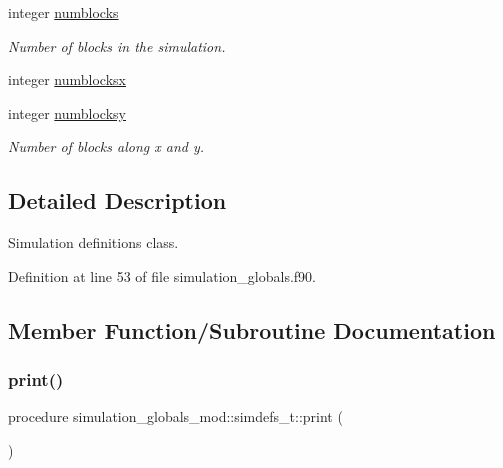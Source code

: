 \begin{DoxyCompactItemize}
integer \mbox{\hyperlink{structsimulation__globals__mod_1_1simdefs__t_a6b7497df8a36fe045f2096963db3bdde}{numblocks}}
\begin{DoxyCompactList}\small\item\em Number of blocks in the simulation. \end{DoxyCompactList}\item 
integer \mbox{\hyperlink{structsimulation__globals__mod_1_1simdefs__t_aebf8c5891821bfe845922fdcead042d6}{numblocksx}}
\item 
integer \mbox{\hyperlink{structsimulation__globals__mod_1_1simdefs__t_a46d35c673edb6e991a57ff9ed925e1bf}{numblocksy}}
\begin{DoxyCompactList}\small\item\em Number of blocks along x and y. \end{DoxyCompactList}\end{DoxyCompactItemize}


\subsection{Detailed Description}
Simulation definitions class. 

Definition at line 53 of file simulation\+\_\+globals.\+f90.



\subsection{Member Function/\+Subroutine Documentation}
\mbox{\label{structsimulation__globals__mod_1_1simdefs__t_a135110b50bcbd621d80df8f7b31fa60e}} 
\subsubsection{\texorpdfstring{print()}{print()}}
{\footnotesize\ttfamily procedure simulation\+\_\+globals\+\_\+mod\+::simdefs\+\_\+t\+::print (\begin{DoxyParamCaption}{ }\end{DoxyParamCaption})\hspace{0.3cm}{\ttfamily [private]}}



